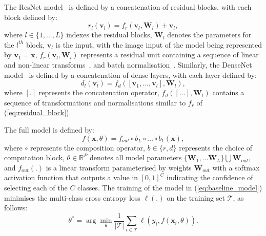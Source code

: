 \documentclass[10pt,journal,compsoc]{IEEEtran}
\begin{document}
The ResNet model~\cite{he2016deep} is defined by a concatenation of residual blocks, with each block defined by:
\begin{equation}
r_l(\mathbf{v}_l) = f_r(\mathbf{v}_l,\mathbf{W}_l) + \mathbf{v}_l,
\label{eq:residual_block}
\end{equation}
where $l \in \{1,...,L\}$ indexes the residual blocks, $\mathbf{W}_l$ denotes the parameters for the $l^{th}$ block, $\mathbf{v}_l$ is the input, with the image input of the model being represented by $\mathbf{v}_1 = \mathbf{x}$, $f_r(\mathbf{v}_l,\mathbf{W}_l)$ represents a residual unit containing a sequence of linear and non-linear transforms~\cite{nair2010rectified}, and batch normalisation~\cite{ioffe2015batch}.  Similarly, the DenseNet model~\cite{huang2016densely} is defined by a concatenation of dense layers, with each layer defined by:
\begin{equation}
d_l(\mathbf{v}_l) = f_d([\mathbf{v}_1, ..., \mathbf{v}_l],\mathbf{W}_l),
\end{equation}
where $[.]$ represents the concatenation operator, $f_d([...],\mathbf{W}_l)$ contains a sequence of transformations and normalisations similar to $f_r$ of (\ref{eq:residual_block}).

The full model is defined by:
\begin{equation}
f(\mathbf{x}, \theta ) = f_{out} \circ b_L \circ ... \circ b_1( \mathbf{x} ),
\label{eq:baseline_model}
\end{equation}
where $\circ$ represents the composition operator, $b \in \{r, d\}$ represents the choice of computation block, $\theta \in \mathbb R^P$ denotes all model parameters $\{ \mathbf{W}_1, ... \mathbf{W}_L \} \bigcup \mathbf{W}_{out}$, and $f_{out}(.)$ is a linear transform parameterised by weights $\mathbf{W}_{out}$ with a softmax activation function that outputs a value in $[0,1]^C$ indicating the confidence of selecting each of the $C$ classes.  The training of the model in (\ref{eq:baseline_model}) minimises the multi-class cross entropy loss $\ell ( . )$ on the training set $\mathcal{T}$, as follows:
\begin{equation}
\theta^* = \arg \min_{\theta} \frac{1}{|\mathcal{T}|}\sum_{i \in \mathcal{T}} \ell \left ( y_i , f(\mathbf{x}_i, \theta )  \right ).
\label{eq:training_CNN}
\end{equation}
\end{document}
